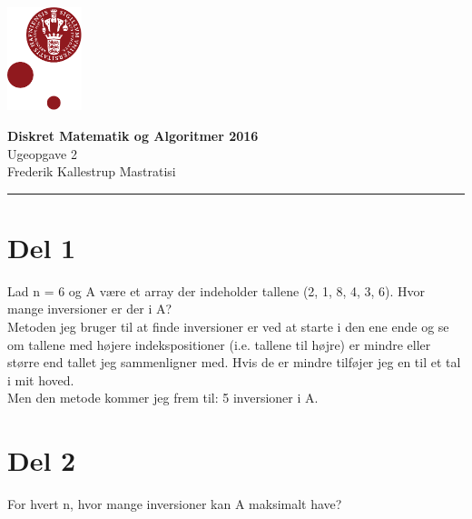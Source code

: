 \documentclass[12pt, a4paper, hidelinks]{article}
\begin{document}
\begin{minipage}[b]{1.0\linewidth}
\includegraphics[height=30mm]{KULogo}

\vspace*{-16ex}
\begin{center}
    {\Large \bf Diskret Matematik og Algoritmer 2016} \vspace*{1ex} \\
    {\large Ugeopgave 2} \vspace*{1ex} \\
    {\large Frederik Kallestrup Mastratisi}
\end{center}
\vspace*{-3pt}
{\color{KU-red}\hrule}
\end{minipage}
\vspace{2ex}

\tableofcontents \newpage

\setcounter{section}{0}
\setcounter{subsection}{-1}

\section{Del 1}
Lad n = 6 og A være et array der indeholder tallene (2, 1, 8, 4, 3, 6). Hvor mange inversioner er der i A? \\ 

Metoden jeg bruger til at finde inversioner er ved at starte i den ene ende og se om tallene med højere indekspositioner (i.e. tallene til højre) er mindre eller større end tallet jeg sammenligner med. Hvis de er mindre tilføjer jeg en til et tal i mit hoved. \\ 

Men den metode kommer jeg frem til: 5 inversioner i A.

\section{Del 2}
For hvert n, hvor mange inversioner kan A maksimalt have? \\
\end{document}
